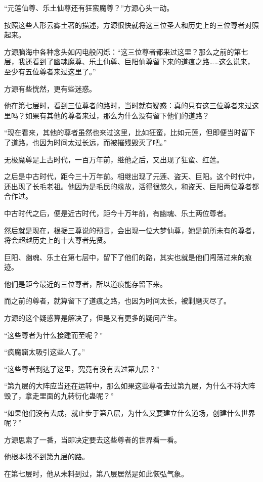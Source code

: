 
\begin{this_body}

“元莲仙尊、乐土仙尊还有狂蛮魔尊？”方源心头一动。

按照这些人形云雾土著的描述，方源很快就将这三位圣人和历史上的三位尊者对照起来。

方源脑海中各种念头如闪电般闪烁：“这三位尊者都来过这里？那么之前的第七层，我还看到了幽魂魔尊、乐土仙尊、巨阳仙尊留下来的道痕之路……这么说来，至少有五位尊者来过这里了。”

方源有些恍然，更有些迷惑。

他在第七层时，看到三位尊者的路时，当时就有疑惑：真的只有这三位尊者来过这里吗？如果有其他的尊者来过，那么为什么没有留下他们的道路？

“现在看来，其他的尊者虽然也来过这里，比如狂蛮，比如元莲，但即便当时留下了道路，也因为时间太过长远，而被摧残毁灭了吧。”

无极魔尊是上古时代，一百万年前，继他之后，又出现了狂蛮、红莲。

之后是中古时代，距今三十万年前。相继出现了元莲、盗天、巨阳。这个时代中，还出现了长毛老祖。他因为是毛民的缘故，活得很悠久，和盗天、巨阳两位尊者都合作过。

中古时代之后，便是近古时代，距今十万年前，有幽魂、乐土两位尊者。

然后就是现在，根据三尊说的预言，会出现一位大梦仙尊，她是前所未有的尊者，将会超越历史上的十大尊者先贤。

巨阳、幽魂、乐土在第七层中，留下了他们的路，其实也就是他们闯荡过来的痕迹。

他们是距今最近的三位尊者，所以道痕能存留下来。

而之前的尊者，就算留下了道痕之路，也因为时间太长，被剿磨灭尽了。

方源的这个疑惑算是解决了，但是又有更多的疑问产生。

“这些尊者为什么接踵而至呢？”

“疯魔窟太吸引这些人了。”

“这些尊者到达了这里，究竟有没有去过第九层？”

“第九层的大阵应当还在运转中，那么如果这些尊者去过第九层，为什么不将大阵毁了，拿走里面的九转衍化蛊呢？”

“如果他们没有去成，就止步于第八层，为什么又要建立什么道场，创建什么世界呢？”

方源思索了一番，当即决定要去这些尊者的世界看一看。

他根本找不到第九层的路。

在第七层时，他从未料到过，第八层居然是如此恢弘气象。


\end{this_body}
